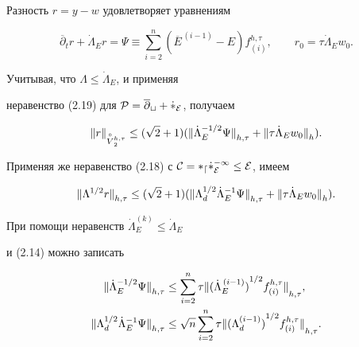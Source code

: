 \begin{pf} Разность $r=y-w$ удовлетворяет уравнениям


$$


\overline\partial_t r+\Dot\Lambda_E r =\Psi\equiv\sum_{i=2}^n


({\overline E}^{\,(i-1)}-E)


f_{(i)}^{h,\tau},\qquad r_0=\tau\Dot\Lambda_Ew_0.


$$


Учитывая, что $\Lambda\le\Dot\Lambda_E$, и применяя


неравенство (2.19) для $\cal P=\overline\partial_t+\Dot\Lambda_E$, получаем 


$$


{\ver r\ver}_{\overset{\circ}{V}{}_2^{h,\tau}}\le(\sqrt 2+1) 


({\ver\Dot\Lambda_E^{-1/2}\Psi\ver}_{h,\tau}+


{\ver\tau\Dot\Lambda_Ew_0\ver}_h).


$$


Применяя же неравенство (2.18) с $\cal C=\Lambda_d\Dot\Lambda_E^{-1}


\le E$,  имеем


$$


{\ver \Lambda^{1/2}r\ver}_{h,\tau}\le (\sqrt 2+1)


({\ver\Lambda_d^{1/2}\Dot\Lambda_E^{-1}\Psi\ver}_{h,\tau}


+{\ver\tau\Dot\Lambda_Ew_0\ver}_h).


$$


При помощи неравенств $\Dot\Lambda_E^{(k)}\le \Dot\Lambda_E$ 


и (2.14) можно записать


\begin{align*}


{\ver\Dot\Lambda_E^{-1/2}\Psi\ver}_{h,\tau} &\le \sum_{i=2}^n\tau


{\ver {(\Dot\Lambda_E^{\,(i-1)})}^{1/2}f_{(i)}^{h,\tau}\ver}_{h,\tau}, \\


%


{\ver\Lambda_d^{1/2}\Dot\Lambda_E^{-1}\Psi\ver}_{h,\tau} &\le \sqrt n


\sum_{i=2}^n\tau{\ver {(\Lambda_d^{(i-1)})}^{1/2}f_{(i)}^{h,\tau}


\ver}_{h,\tau}.


\end{align*}






\end{pf}

